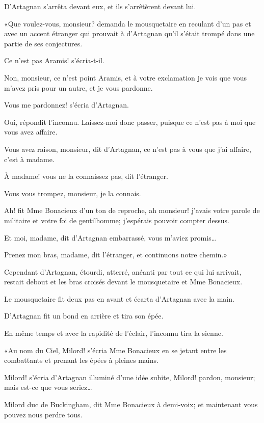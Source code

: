D'Artagnan s'arrêta devant eux, et ils s'arrêtèrent devant lui. 

«Que voulez-vous, monsieur? demanda le mousquetaire en reculant d'un pas et avec un accent étranger qui prouvait à d'Artagnan qu'il s'était trompé dans une partie de ses conjectures. 

\speak  Ce n'est pas Aramis! s'écria-t-il. 

\speak  Non, monsieur, ce n'est point Aramis, et à votre exclamation je vois que vous m'avez pris pour un autre, et je vous pardonne. 

\speak  Vous me pardonnez! s'écria d'Artagnan. 

\speak  Oui, répondit l'inconnu. Laissez-moi donc passer, puisque ce n'est pas à moi que vous avez affaire. 

\speak  Vous avez raison, monsieur, dit d'Artagnan, ce n'est pas à vous que j'ai affaire, c'est à madame. 

\speak  À madame! vous ne la connaissez pas, dit l'étranger. 

\speak  Vous vous trompez, monsieur, je la connais. 

\speak  Ah! fit Mme Bonacieux d'un ton de reproche, ah monsieur! j'avais votre parole de militaire et votre foi de gentilhomme; j'espérais pouvoir compter dessus. 

\speak  Et moi, madame, dit d'Artagnan embarrassé, vous m'aviez promis\dots 

\speak  Prenez mon bras, madame, dit l'étranger, et continuons notre chemin.» 

Cependant d'Artagnan, étourdi, atterré, anéanti par tout ce qui lui arrivait, restait debout et les bras croisés devant le mousquetaire et Mme Bonacieux. 

Le mousquetaire fit deux pas en avant et écarta d'Artagnan avec la main. 

D'Artagnan fit un bond en arrière et tira son épée. 

En même temps et avec la rapidité de l'éclair, l'inconnu tira la sienne. 

«Au nom du Ciel, Milord! s'écria Mme Bonacieux en se jetant entre les combattants et prenant les épées à pleines mains. 

\speak  Milord! s'écria d'Artagnan illuminé d'une idée subite, Milord! pardon, monsieur; mais est-ce que vous seriez\dots 

\speak  Milord duc de Buckingham, dit Mme Bonacieux à demi-voix; et maintenant vous pouvez nous perdre tous. 

